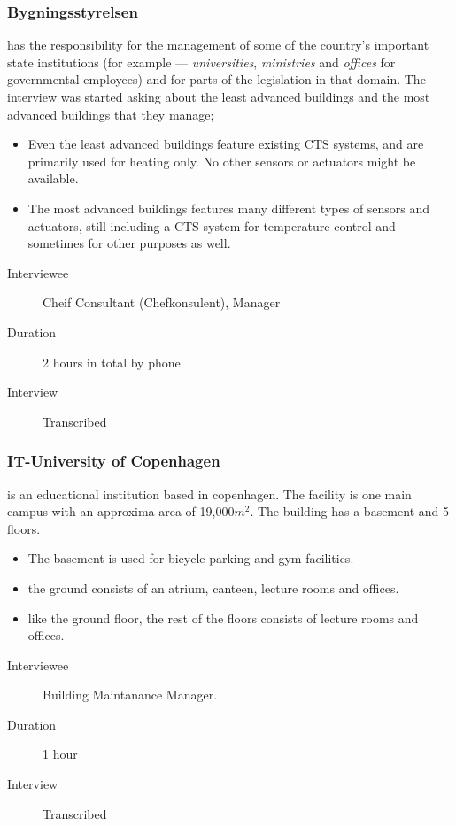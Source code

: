 \subsubsection{Bygningsstyrelsen} has the responsibility for the management of some of the country's important state institutions (for example --- \textit{universities}, \textit{ministries} and \textit{offices} for governmental employees) and for parts of the legislation in that domain. The interview was started asking about the least advanced buildings and the most advanced buildings that they manage;
\begin{itemize}
	\item Even the least advanced buildings feature existing CTS systems, and are primarily used for heating only. No other sensors or actuators might be available.
	\item The most advanced buildings features many different types of sensors and actuators, still including a CTS system for temperature control and sometimes for other purposes as well. 
\end{itemize}	
\begin{description}
	\item[Interviewee] Cheif Consultant (Chefkonsulent), Manager
	\item[Duration] 2 hours in total by phone
	\item[Interview] Transcribed
\end{description}

\subsubsection{IT-University of Copenhagen} is an educational institution based in copenhagen. The facility is one main campus with an approxima area of 19,000$m^2$. The building has a basement and 5 floors.
\begin{itemize}
	\item The basement is used for bicycle parking and gym facilities.
	\item the ground consists of an atrium, canteen, lecture rooms and offices.
	\item like the ground floor, the rest of the floors consists of lecture rooms and offices.
\end{itemize}
\begin{description}
	\item[Interviewee] Building Maintanance Manager.
	\item[Duration] 1 hour
	\item[Interview] Transcribed
\end{description}

